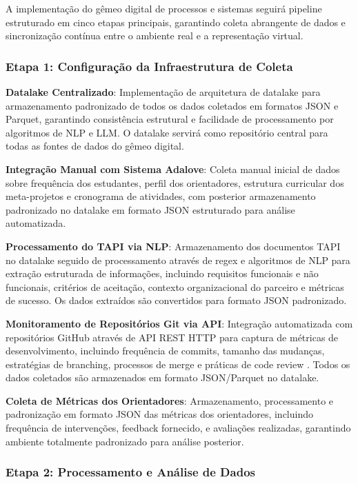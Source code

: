 \documentclass[12pt, a4paper, oneside]{abntex2}
\begin{document}
A implementação do gêmeo digital de processos e sistemas seguirá pipeline estruturado em cinco etapas principais, garantindo coleta abrangente de dados e sincronização contínua entre o ambiente real e a representação virtual.

\subsubsection{Etapa 1: Configuração da Infraestrutura de Coleta}

\textbf{Datalake Centralizado}: Implementação de arquitetura de datalake para armazenamento padronizado de todos os dados coletados em formatos JSON e Parquet, garantindo consistência estrutural e facilidade de processamento por algoritmos de NLP e LLM. O datalake servirá como repositório central para todas as fontes de dados do gêmeo digital.

\textbf{Integração Manual com Sistema Adalove}: Coleta manual inicial de dados sobre frequência dos estudantes, perfil dos orientadores, estrutura curricular dos meta-projetos e cronograma de atividades, com posterior armazenamento padronizado no datalake em formato JSON estruturado para análise automatizada.

\textbf{Processamento do TAPI via NLP}: Armazenamento dos documentos TAPI no datalake seguido de processamento através de regex e algoritmos de NLP para extração estruturada de informações, incluindo requisitos funcionais e não funcionais, critérios de aceitação, contexto organizacional do parceiro e métricas de sucesso. Os dados extraídos são convertidos para formato JSON padronizado.

\textbf{Monitoramento de Repositórios Git via API}: Integração automatizada com repositórios GitHub através de API REST HTTP \cite{kalliamvakou2014} para captura de métricas de desenvolvimento, incluindo frequência de commits, tamanho das mudanças, estratégias de branching, processos de merge e práticas de code review \cite{perezriverol2016}. Todos os dados coletados são armazenados em formato JSON/Parquet no datalake.

\textbf{Coleta de Métricas dos Orientadores}: Armazenamento, processamento e padronização em formato JSON das métricas dos orientadores, incluindo frequência de intervenções, feedback fornecido, e avaliações realizadas, garantindo ambiente totalmente padronizado para análise posterior.

\subsubsection{Etapa 2: Processamento e Análise de Dados}
\end{document}
